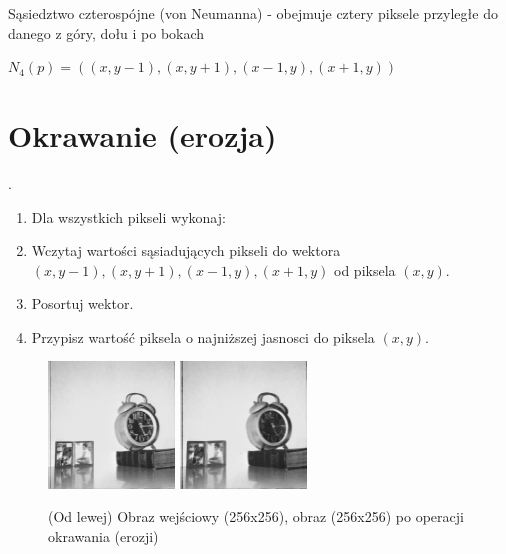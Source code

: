 \documentclass[final,a4paper,openany,12pt]{mwbk}
\begin{document}
	Sąsiedztwo czterospójne (von Neumanna) - obejmuje cztery piksele przyległe do danego z góry, dołu i po bokach
	\begin{center}
	 $N_{4}(p)=((x,y-1),(x,y+1),(x-1,y),(x+1,y))$
	 \end{center}

\section{ Okrawanie (erozja)}
.\hfill\\
\indent
\begin{enumerate}	
		\item Dla wszystkich pikseli wykonaj:
		\item Wczytaj wartości sąsiadujących pikseli do wektora $(x,y-1),(x,y+1),(x-1,y),(x+1,y)$ od piksela $(x,y)$.
		\item Posortuj wektor.
		\item Przypisz wartość piksela o najniższej jasnosci do piksela $(x,y)$.
	\end{enumerate}

\begin{figure}[H]
	\begin{center}
		\includegraphics[width=0.3\textwidth]{1/1Gray_E_Original}
		\includegraphics[width=0.3\textwidth]{1/1Gray_E_Result}
	\end{center}
	\caption{(Od lewej) Obraz wejściowy (256x256), obraz (256x256) po operacji okrawania (erozji) }
\end{figure}
\end{document}
